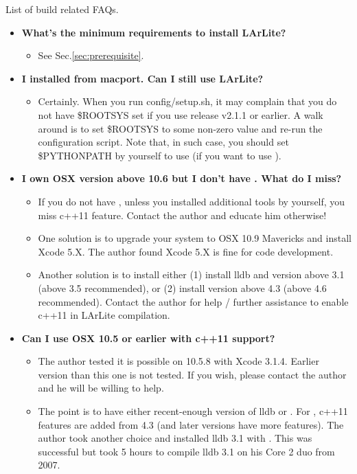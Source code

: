 List of build related FAQs.

\begin{itemize}

\item[] {\bf What's the minimum requirements to install LArLite?}
  \begin{itemize}
    \item See Sec.\ref{sec:prerequisite}.
  \end{itemize}

\item[] {\bf I installed \ROOT from macport. Can I still use LArLite?}
  \begin{itemize}
    \item Certainly. When you run {\ttfamily config/setup.sh}, it may
      complain that you do not have {\ttfamily \$ROOTSYS} set if you use
      release v2.1.1 or earlier. A walk around is to set {\ttfamily \$ROOTSYS}
      to some non-zero value and re-run the configuration script. Note that,
      in such case, you should set {\ttfamily \$PYTHONPATH} by yourself to
      use \PyROOT (if you want to use \PyROOT).
  \end{itemize}

\item[] {\bf I own OSX version above 10.6 but I don't have \clang. What do I miss?}
  \begin{itemize}
    \item If you do not have \clang, unless you installed additional tools 
      by yourself, you miss {\ttfamily c++11} feature. Contact the author 
      and educate him otherwise!
    \item One solution is to upgrade your system to OSX 10.9 Mavericks and
      install Xcode 5.X. The author found Xcode 5.X is fine for code
      development.
    \item Another solution is to install either (1) install {\ttfamily lldb}
      and \clang version above 3.1 (above 3.5 recommended), or (2)
      install \gpp version above 4.3 (above 4.6 recommended). Contact      
      the author for help / further assistance to enable {\ttfamily c++11}
      in LArLite compilation.      
  \end{itemize}

\item[] {\bf Can I use OSX 10.5 or earlier with {\ttfamily c++11} support?}
  \begin{itemize}
    \item The author tested it is possible on 10.5.8 with Xcode 3.1.4. Earlier
      version than this one is not tested. If you wish, please contact the author
      and he will be willing to help.
    \item The point is to have either recent-enough version of {\ttfamily lldb} 
      or \gpp. For \gpp, {\ttfamily c++11} features are added from 4.3 (and later
      versions have more features). The author took another choice and installed
      {\ttfamily lldb} 3.1 with . This was successful but took 5 hours 
      to compile {\ttfamily lldb} 3.1 on his Core 2 duo from 2007.
  \end{itemize}


\end{itemize}
